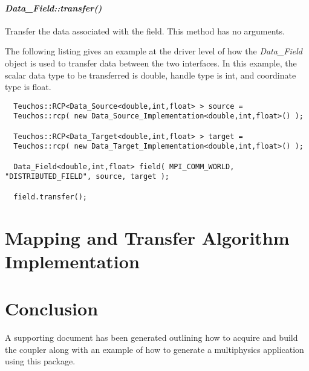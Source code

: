\documentclass[letterpaper]{article}
\begin{document}
\paragraph{\sl Data\_Field::transfer()}
Transfer the data associated with the field. This method has no
arguments. 

The following listing gives an example at the driver level of how the
{\sl Data\_Field} object is used to transfer data between the two
interfaces. In this example, the scalar data type to be transferred is
double, handle type is int, and coordinate type is float.

\begin{lstlisting}
  Teuchos::RCP<Data_Source<double,int,float> > source = 
  Teuchos::rcp( new Data_Source_Implementation<double,int,float>() );

  Teuchos::RCP<Data_Target<double,int,float> > target = 
  Teuchos::rcp( new Data_Target_Implementation<double,int,float>() );

  Data_Field<double,int,float> field( MPI_COMM_WORLD, "DISTRIBUTED_FIELD", source, target ); 

  field.transfer();
\end{lstlisting}

\section{Mapping and Transfer Algorithm Implementation}



\section{Conclusion}

A supporting document has been generated outlining how to acquire and
build the coupler along with an example of how to generate a
multiphysics application using this package.

\pagebreak


\end{document}
